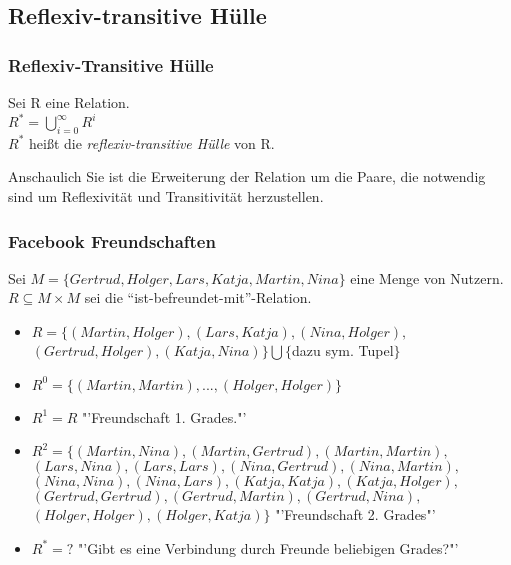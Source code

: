 \subsection{Reflexiv-transitive Hülle}
\begin{frame}
	\frametitle{Reflexiv-Transitive Hülle}
	\begin{definition}
    Sei R eine Relation.\\
		$R^* = \bigcup \limits_{i=0}^{\infty} R^i$\\
		$R^*$ heißt die \emph{reflexiv-transitive Hülle} von R.
	\end{definition} \pause
  \begin{alertblock}{Anschaulich}
		Sie ist die Erweiterung der Relation um die Paare, die notwendig sind um Reflexivität und Transitivität herzustellen.
  \end{alertblock}
\end{frame}

\begin{frame}
	\frametitle{Facebook Freundschaften}
	\begin{exampleblock}{}
			Sei $M = \{ Gertrud, Holger, Lars, Katja, Martin, Nina \}$ eine Menge von Nutzern.\\
			$R \subseteq M \times M $ sei die "`ist-befreundet-mit"'-Relation.
		\begin{itemize}
			\item $R = \{ (Martin,Holger), (Lars,Katja), (Nina,Holger),$ \\
						$(Gertrud,Holger), (Katja, Nina) \} \bigcup \{${dazu sym. Tupel}$\}$ \pause
			\item $R^0=\{ (Martin,Martin), ..., (Holger,Holger) \}$ \pause
			\item $R^1=R$ "'Freundschaft 1. Grades."' \pause
			\item $R^2=\{ (Martin,Nina), (Martin,Gertrud), (Martin,Martin),$ \\
						$(Lars,Nina), (Lars,Lars), (Nina,Gertrud),(Nina,Martin),$ \\
						$(Nina,Nina), (Nina,Lars), (Katja,Katja), (Katja,Holger), $ \\
						$(Gertrud,Gertrud), (Gertrud,Martin), (Gertrud,Nina), $ \\
						$(Holger,Holger), (Holger,Katja)\}$ "'Freundschaft 2. Grades"' \pause
			\item $R^*=?$ "'Gibt es eine Verbindung durch Freunde beliebigen Grades?"'
		\end{itemize}
	\end{exampleblock}
\end{frame}

